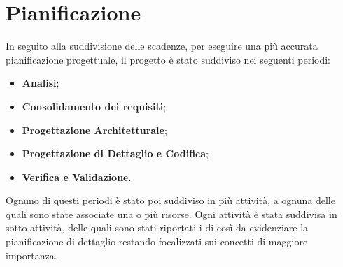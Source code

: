 \section{Pianificazione}
	In seguito alla suddivisione delle scadenze, per eseguire una più accurata pianificazione progettuale, il progetto è stato suddiviso nei seguenti periodi: \\
	\begin{itemize}
		\item \textbf{Analisi};
		\item \textbf{Consolidamento dei requisiti};
		\item \textbf{Progettazione Architetturale};
		\item \textbf{Progettazione di Dettaglio e Codifica};
		\item \textbf{Verifica e Validazione}. \\
	\end{itemize}
	Ognuno di questi periodi è stato poi suddiviso in più attività, a ognuna delle quali sono state associate una o più risorse. Ogni attività è stata suddivisa in sotto-attività, delle quali sono stati riportati i  di  così da evidenziare la pianificazione di dettaglio restando focalizzati sui concetti di maggiore importanza.
